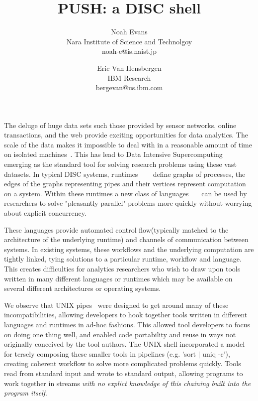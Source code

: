 \documentclass[11pt, letterpaper]{article}
\title{PUSH: a DISC shell}
\author{Noah Evans \\Nara Institute of Science and Technolgoy \\noah-e@is.naist.jp  \and Eric Van Hensbergen \\IBM Research \\bergevan@us.ibm.com}
\date{}
\begin{document}
\maketitle

The deluge of huge data sets such those provided by sensor networks, 
online transactions, and the web provide exciting opportunities for data
analytics.  The scale of the data makes it impossible to deal with in a
reasonable amount of time on isolated machines~\cite{barroso2003wsp}.
This has lead to Data Intensive Supercomputing~\cite{bryant2007dis} emerging
as the standard tool for solving research problems using these vast datasets.
In typical DISC systems, 
runtimes ~\cite{dean2008msd}~\cite{bialecki:hfr}~\cite{isard2007ddd} define 
graphs of processes, the edges of the graphs representing 
pipes and their vertices represent computation on a system.  
Within these runtimes a new class of 
languages~\cite{pike2005idp}~\cite{yu2008dsg}~\cite{olston2008pln} 
can be used by researchers to solve "pleasantly parallel" 
problems more quickly without worrying about explicit concurrency.

These languages provide automated control flow(typically matched to the 
architecture of the underlying runtime) and channels of communication between 
systems.
In existing systems, these workflows and the underlying computation are 
tightly linked, tying solutions to a particular runtime, workflow and language.
This creates difficulties for analytics researchers who wish to draw upon
tools written in many different languages or runtimes which may be available
on several different architectures or operating systems.

We observe that UNIX pipes~\cite{mcilroy1964paf} were designed to get around 
many of these incompatibilities, allowing developers to hook together tools 
written in different languages and runtimes in ad-hoc fashions.  
This allowed tool developers to focus on doing one thing well, and
enabled code portability and reuse in ways not originally conceived by
the tool authors.  The UNIX shell incorporated a model for tersely composing 
these smaller tools in pipelines (e.g. 'sort $|$ uniq -c'),  
creating coherent workflow to solve more complicated problems 
quickly. 
Tools read from standard input and wrote to standard output, allowing programs 
to work together in streams \emph{with no explict knowledge of this chaining
built into the program itself}.
\end{document}
